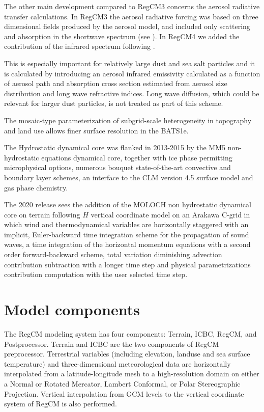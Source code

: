 The other main development compared to \ac{RegCM}3 concerns the aerosol
radiative transfer calculations. In \ac{RegCM}3 the aerosol radiative forcing
was based on three dimensional fields produced by the aerosol model, and
included only scattering and absorption in the shortwave spectrum (see
\cite{Giorgi_02}). In \ac{RegCM}4 we added the contribution of the infrared
spectrum following \cite{Solmon_08}.

This is especially important for relatively large dust and sea salt particles
and it is calculated by introducing an aerosol infrared emissivity calculated
as a function of aerosol path and absorption cross section estimated from
aerosol size distribution and long wave refractive indices. Long wave diffusion,
which could be relevant for larger dust particles, is not treated as part of
this scheme.

The mosaic-type parameterization of subgrid-scale heterogeneity in
topography and land use \citep{Giorgi_03} allows finer surface resolution
in the \ac{BATS1e}.

The Hydrostatic dynamical core was flanked in 2013-2015 by the \ac{MM5}
non-hydrostatic equations dynamical core, together with ice phase permitting
microphysical options, numerous bouquet state-of-the-art convective and
boundary layer schemes, an interface to the \ac{CLM} version 4.5 surface model
and gas phase chemistry.

The 2020 release sees the addition of the \ac{MOLOCH} non hydrostatic
dynamical core on terrain following $H$ vertical coordinate model on an
Arakawa C-grid in which wind and thermodynamical variables are horizontally
staggered with an implicit, Euler-backward time integration scheme for the
propagation of sound waves, a time integration of the horizontal momentum
equations with a second order forward-backward scheme, total variation
diminishing advection contribution subtraction with a longer time step and
physical parametrizations contribution computation with the user selected
time step.

\section{Model components}

The \ac{RegCM} modeling system has four components: Terrain, ICBC, \ac{RegCM},
and Postprocessor.  Terrain and ICBC are the two components of \ac{RegCM}
preprocessor. Terrestrial variables (including elevation, landuse and sea
surface temperature) and three-dimensional meteorological data are
horizontally interpolated from a latitude-longitude mesh to a high-resolution
domain on either a Normal or Rotated Mercator, Lambert Conformal, or Polar
Stereographic Projection. Vertical interpolation from \ac{GCM} levels to the
vertical coordinate system of \ac{RegCM} is also performed.

